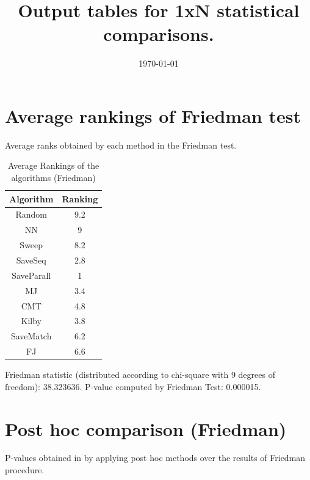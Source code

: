 \documentclass[a4paper,10pt]{article}
\title{Output tables for 1xN statistical comparisons.}
\author{}
\date{\today}
\begin{document}
\begin{landscape}
\pagestyle{empty}
\maketitle
\thispagestyle{empty}

\section{Average rankings of Friedman test}


Average ranks obtained by each method in the Friedman test.

\begin{table}[!htp]
\centering
\begin{tabular}{|c|c|}\hline
Algorithm&Ranking\\\hline
Random&9.2\\NN&9\\Sweep&8.2\\SaveSeq&2.8\\SaveParall&1\\MJ&3.4\\CMT&4.8\\Kilby&3.8\\SaveMatch&6.2\\FJ&6.6\\\hline\end{tabular}
\caption{Average Rankings of the algorithms (Friedman)}
\end{table}

Friedman statistic (distributed according to chi-square with 9 degrees of freedom): 38.323636. \newline P-value computed by Friedman Test: 0.000015.\newline


\newpage

\section{Post hoc comparison (Friedman)}


P-values obtained in by applying post hoc methods over the results of Friedman procedure.


\end{landscape}
\end{document}
